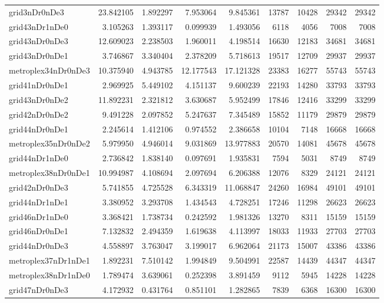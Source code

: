 \begin{longtable}{|l|r|r|r|r|r|r|r|r|}
grid3nDr0nDe3 & 23.842105 & 1.892297 & 7.953064 & 9.845361 & 13787 & 10428 & 29342 & 29342 \\
grid43nDr1nDe0 & 3.105263 & 1.393117 & 0.099939 & 1.493056 & 6118 & 4056 & 7008 & 7008 \\
grid43nDr0nDe3 & 12.609023 & 2.238503 & 1.960011 & 4.198514 & 16630 & 12183 & 34681 & 34681 \\
grid43nDr0nDe1 & 3.746867 & 3.340404 & 2.378209 & 5.718613 & 19517 & 12709 & 29937 & 29937 \\
metroplex34nDr0nDe3 & 10.375940 & 4.943785 & 12.177543 & 17.121328 & 23383 & 16277 & 55743 & 55743 \\
grid41nDr0nDe1 & 2.969925 & 5.449102 & 4.151137 & 9.600239 & 22193 & 14280 & 33793 & 33793 \\
grid43nDr0nDe2 & 11.892231 & 2.321812 & 3.630687 & 5.952499 & 17846 & 12416 & 33299 & 33299 \\
grid42nDr0nDe2 & 9.491228 & 2.097852 & 5.247637 & 7.345489 & 15852 & 11179 & 29879 & 29879 \\
grid44nDr0nDe1 & 2.245614 & 1.412106 & 0.974552 & 2.386658 & 10104 & 7148 & 16668 & 16668 \\
metroplex35nDr0nDe2 & 5.979950 & 4.946014 & 9.031869 & 13.977883 & 20570 & 14081 & 45678 & 45678 \\
grid44nDr1nDe0 & 2.736842 & 1.838140 & 0.097691 & 1.935831 & 7594 & 5031 & 8749 & 8749 \\
metroplex38nDr0nDe1 & 10.994987 & 4.108694 & 2.097694 & 6.206388 & 12076 & 8329 & 24121 & 24121 \\
grid42nDr0nDe3 & 5.741855 & 4.725528 & 6.343319 & 11.068847 & 24260 & 16984 & 49101 & 49101 \\
grid44nDr1nDe1 & 3.380952 & 3.293708 & 1.434543 & 4.728251 & 17246 & 11298 & 26623 & 26623 \\
grid46nDr1nDe0 & 3.368421 & 1.738734 & 0.242592 & 1.981326 & 13270 & 8311 & 15159 & 15159 \\
grid46nDr0nDe1 & 7.132832 & 2.494359 & 1.619638 & 4.113997 & 18033 & 11933 & 27703 & 27703 \\
grid44nDr0nDe3 & 4.558897 & 3.763047 & 3.199017 & 6.962064 & 21173 & 15007 & 43386 & 43386 \\
metroplex37nDr1nDe1 & 1.892231 & 7.510142 & 1.994849 & 9.504991 & 22587 & 14439 & 44347 & 44347 \\
metroplex38nDr1nDe0 & 1.789474 & 3.639061 & 0.252398 & 3.891459 & 9112 & 5945 & 14228 & 14228 \\
grid47nDr0nDe3 & 4.172932 & 0.431764 & 0.851101 & 1.282865 & 7839 & 6368 & 16300 & 16300 \\

\end{longtable}
